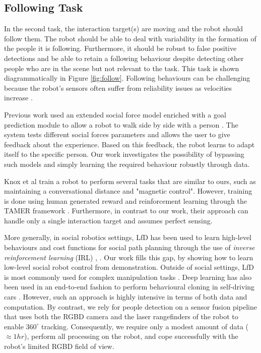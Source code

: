 \documentclass[letterpaper, 10 pt, conference]{ieeeconf}
\begin{document}
\begin{figure}[tbh]
    \vspace{-2mm}

  \label{fig:behaviors}
  \end{figure}

\subsection{Following Task} 

In the second task, the interaction target(s) are moving and the robot should follow them. The robot should be able to deal with variability in the formation of the people it is following. Furthermore, it should be robust to false positive detections and be able to retain a following behaviour despite detecting other people who are in the scene but not relevant to the task. This task is shown diagrammatically in Figure \ref{fig:follow}. Following behaviours can be challenging because the robot's sensors often suffer from reliability issues as velocities increase \cite{kobilarov2006people}.

Previous work used an extended social force model enriched with a goal prediction module to allow a robot to walk side by side with a person \cite{ferrer2016robot}. The system tests different social forces parameters and allows the user to give feedback about the experience. Based on this feedback, the robot learns to adapt itself to the specific person.  Our work investigates the possibility of bypassing such models and simply learning the required behaviour robustly through data.  

Knox et al \cite{knox2013training} train a robot to perform several tasks that are similar to ours, such as maintaining a conversational distance and "magnetic control". However, training is done using human generated reward and reinforcement learning through the TAMER framework \cite{knox2009interactively}. Furthermore, in contrast to our work, their approach can handle only a single interaction target and assumes perfect sensing.

More generally, in social robotics settings, LfD has been used to learn high-level behaviours \cite{louie2016learning} \cite{lockerd2004tutelage} and cost functions for social path planning through the use of \emph{inverse reinforcement learning} (IRL) \cite{abbeel2004apprenticeship}, \cite{henry2010learning}. Our work fills this gap, by showing how to learn low-level social robot control from demonstration. Outside of social settings, LfD is most commonly used for complex manipulation tasks \cite{argall2009survey}. Deep learning has also been used in an end-to-end fashion to perform behavioural cloning in self-driving cars \cite{bojarski2016end}. However, such an approach is highly intensive in terms of both data and computation.  By contrast, we rely for people detection on a sensor fusion pipeline that uses both the RGBD camera and the laser rangefinders of the robot to enable $360^\circ$ tracking.  Consequently, we require only a modest amount of data ($\approx 1hr$), perform all processing on the robot, and cope successfully with the robot's limited RGBD field of view.
\end{document}
